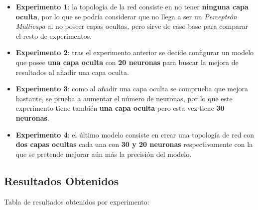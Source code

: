 \documentclass{uc3mpracticas}
\begin{document}
      \begin{itemize}
        \item \textbf{Experimento 1}: la topología de la red consiste en no tener \textbf{ninguna capa oculta}, por lo que se podría considerar que no llega a ser un \textit{Perceptrón Multicapa} al no poseer capas ocultas, pero sirve de caso base para comparar el resto de experimentos.
        \item \textbf{Experimento 2}: tras el experimento anterior se decide configurar un modelo que posee \textbf{una capa oculta} con \textbf{20 neuronas} para buscar la mejora de resultados al añadir una capa oculta.
        \item \textbf{Experimento 3}: como al añadir una capa oculta se comprueba que mejora bastante, se prueba a aumentar el número de neuronas, por lo que este experimento tiene también \textbf{una capa oculta} pero esta vez tiene \textbf{30 neuronas}.
        \item \textbf{Experimento 4}: el último modelo consiste en crear una topología de red con \textbf{dos capas ocultas} cada una con \textbf{30 y 20 neuronas} respectivamente con la que se pretende mejorar aún más la precisión del modelo.
      \end{itemize}



    \subsection{Resultados Obtenidos}

    Tabla de resultados obtenidos por experimento:
\end{document}
